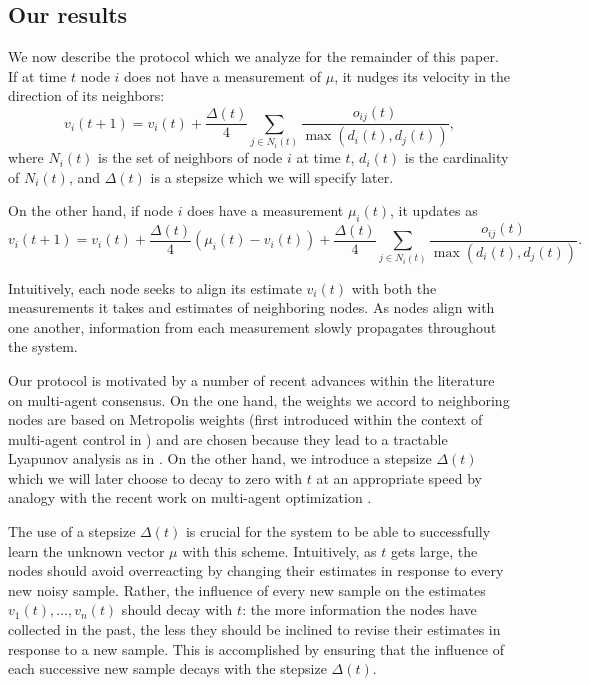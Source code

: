 \documentclass[final]{siamltex}
\begin{document}
\subsection{Our results\label{section:controllaw}\label{section:results}} We now describe the protocol which we analyze for the remainder of
this paper. If at time $t$ node $i$ does not have a measurement of $\mu$, it nudges its velocity in the direction of its neighbors:
\begin{equation} \label{nonmeasuringupdate} v_i(t+1) = v_i(t) + \frac{\Delta(t)}{4} \sum_{j \in N_i(t)} \frac{{{{o_{ij}(t)}}}}{\max(d_i(t),d_j(t))},
\end{equation} where $N_i(t)$ is the set of neighbors of node $i$ at time $t$, $d_i(t)$ is the cardinality of $N_i(t)$, and $\Delta(t)$ is a stepsize 
which we will specify later. 

On the other hand, if node $i$ does have a measurement $\mu_i(t)$, it updates as
\begin{equation} \label{measuringupdate} v_i(t+1) = v_i(t) + \frac{\Delta(t)}{4} \left( \mu_i(t) - v_i(t) \right) +  \frac{\Delta(t)}{4} \sum_{j \in N_i(t)} \frac{{{{o_{ij}(t)}}}}{\max(d_i(t), d_j(t))}. \end{equation} 

Intuitively, each node seeks to align its estimate $v_i(t)$ with both the measurements it takes and estimates of neighboring nodes. As nodes align with one another, information from each measurement slowly propagates throughout the system. 

Our protocol is motivated by a number of recent advances within the literature on multi-agent consensus. On the one hand, the weights we accord to neighboring nodes are based on Metropolis weights (first introduced within the context of multi-agent control in \cite{bdx04}) and are chosen because they lead to a tractable Lyapunov analysis as in \cite{noot09}. On the other hand, we introduce a stepsize $\Delta(t)$ which we will later choose to decay to zero with $t$ at an appropriate speed by analogy with the recent work on multi-agent optimization 
\cite{no09, sn11, yns12}.

{{{ The use of a stepsize $\Delta(t)$ is crucial for the system to be able to successfully learn the unknown vector $\mu$ with this scheme. Intuitively, as $t$ gets large,  the nodes should avoid  overreacting by changing their 
estimates in response to every new noisy sample. Rather, the influence of every new sample on the estimates $v_1(t), \ldots, v_n(t)$ should decay with $t$: the
more information the nodes have collected in the past, the less they should be inclined to revise their estimates in response to a new sample. This is accomplished by ensuring that the influence of each successive new sample decays with the stepsize $\Delta(t)$.}}}
\end{document}
